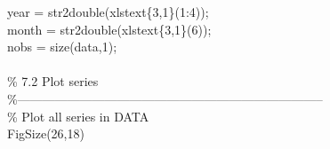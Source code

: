 \hspace{1mm}\hspace{5mm} \hspace{5mm} \hspace{5mm} \hspace{5mm} year = str2double(xlstext\{3,1\}(1:4)); \\ 
\hspace{1mm}\hspace{5mm} \hspace{5mm} \hspace{5mm} \hspace{5mm} month = str2double(xlstext\{3,1\}(6)); \\ 
\hspace{1mm}\hspace{5mm} \hspace{5mm} \hspace{5mm} \hspace{5mm} nobs = size(data,1); \\ 
\hspace{1mm}\hspace{5mm} \hspace{5mm} \hspace{5mm} \hspace{5mm}  \\ 
\hspace{1mm}\hspace{5mm} \hspace{5mm} \hspace{5mm} \hspace{5mm} \textcolor{matlabgreen}{\% 7.2 Plot series }\\ 
\hspace{1mm}\hspace{5mm} \hspace{5mm} \hspace{5mm} \hspace{5mm} \textcolor{matlabgreen}{\%--------------------------------------------------------------------------  }\\ 
\hspace{1mm}\hspace{5mm} \hspace{5mm} \hspace{5mm} \hspace{5mm} \textcolor{matlabgreen}{\% Plot all series in DATA }\\ 
\hspace{1mm}\hspace{5mm} \hspace{5mm} \hspace{5mm} \hspace{5mm} FigSize(26,18) \\ 
